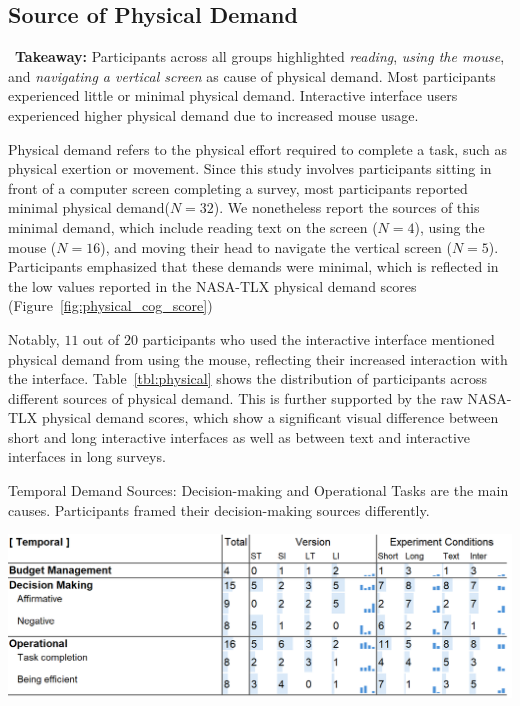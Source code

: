 \subsection{Source of Physical Demand} 
\label{sec:physical}

\vspace{5pt}
\begin{tldrbox}
    \faInfoCircle~\xspace\textbf{Takeaway:} Participants across all groups highlighted \textit{reading}, \textit{using the mouse}, and \textit{navigating a vertical screen} as cause of physical demand. Most participants experienced little or minimal physical demand. Interactive interface users experienced higher physical demand due to increased mouse usage.
\end{tldrbox}

Physical demand refers to the physical effort required to complete a task, such as physical exertion or movement. Since this study involves participants sitting in front of a computer screen completing a survey, most participants reported minimal physical demand($N=32$). We nonetheless report the sources of this minimal demand, which include reading text on the screen ($N=4$), using the mouse ($N=16$), and moving their head to navigate the vertical screen ($N=5$). Participants emphasized that these demands were minimal, which is reflected in the low values reported in the NASA-TLX physical demand scores (Figure~\ref{fig:physical_cog_score})

Notably, $11$ out of $20$ participants who used the interactive interface mentioned physical demand from using the mouse, reflecting their increased interaction with the interface. Table~\ref{tbl:physical} shows the distribution of participants across different sources of physical demand. This is further supported by the raw NASA-TLX physical demand scores, which show a significant visual difference between short and long interactive interfaces as well as between text and interactive interfaces in long surveys.

\begin{table}[h]
    \caption{Temporal Demand Sources: Decision-making and Operational Tasks are the main causes. Participants framed their decision-making sources differently.}
    \label{tbl:temporal}
    \includegraphics[width=\linewidth]{content/image/cog/temporal_table.png}
\end{table}

